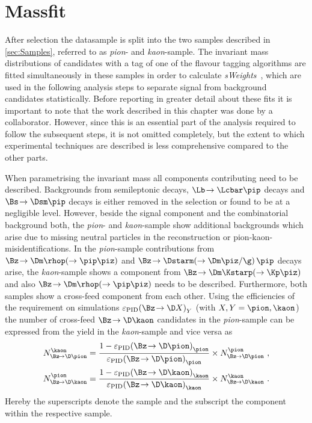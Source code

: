\chapter{Massfit}
\label{ch:massfit}


After selection the datasample is split into the two samples described in \cref{sec:Samples}, referred to as \emph{pion}- and \emph{kaon}-sample.
The invariant \Bz mass distributions of candidates with a tag of one of the flavour tagging algorithms are fitted simultaneously in these samples in order to calculate \emph{sWeights}~\cite{Pivk:2004ty}, which are used in the following analysis steps to separate signal from background candidates statistically.
Before reporting in greater detail about these fits it is important to note that the work described in this chapter was done by a collaborator.
However, since this is an essential part of the analysis required to follow the subsequent steps, it is not omitted completely, but the extent to which \eg experimental techniques are described is less comprehensive compared to the other parts.

When parametrising the invariant \Bz mass all components contributing need to be described. Backgrounds from semileptonic decays, $\Lb\!\to\Lcbar\pip$ decays and $\Bs\!\to\Dsm\pip$ decays is either removed in the selection or found to be at a negligible level.
However, beside the signal component and the combinatorial background both, the \emph{pion}- and \emph{kaon}-sample show additional backgrounds which arise due to missing neutral particles in the reconstruction or pion-kaon-misidentifications.
In the \emph{pion}-sample contributions from $\Bz\!\to\Dm\rhop\!\left(\to\pip\piz\right)$ and $\Bz\!\to\Dstarm\!\left(\to\Dm\piz/\g\right)\pip$ decays arise, the \emph{kaon}-sample shows a component from $\Bz\!\to\Dm\Kstarp\!\left(\to\Kp\piz\right)$ and also $\Bz\!\to\Dm\rhop\!\left(\to\pip\piz\right)$  needs to be described.
Furthermore, both samples show a cross-feed component from each other.
Using the efficiencies of the \dllkpi requirement on simulations $\varepsilon_{\text{PID}}\!\left(\Bz\!\to\D X\right)_Y$ (with $X, Y=\pion, \kaon$) the number of cross-feed $\Bz\!\to\D\kaon$ candidates in the \emph{pion}-sample can be expressed from the yield in the \emph{kaon}-sample and vice versa as
\begin{equation}
\begin{aligned}
N_{\Bz\!\to\D\pion}^{\kaon}&=\frac{1-\varepsilon_{\text{PID}}\!\left(\Bz\!\to\D \pion\right)_{\pion}}{\varepsilon_{\text{PID}}\!\left(\Bz\!\to\D \pion\right)_{\pion}}\times N_{\Bz\!\to\D\pion}^{\pion} \,\,,\\
N_{\Bz\!\to\D\kaon}^{\pion}&=\frac{1-\varepsilon_{\text{PID}}\!\left(\Bz\!\to\D \kaon\right)_{\kaon}}{\varepsilon_{\text{PID}}\!\left(\Bz\!\to\D \kaon\right)_{\kaon}}\times N_{\Bz\!\to\D\kaon}^{\kaon}\,\,.\label{eq:ConstrainCrossFeed}
\end{aligned}
\end{equation}
Hereby the superscripts denote the sample and the subscript the component within the respective sample.

